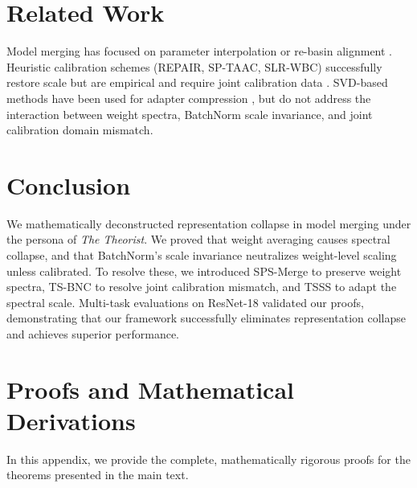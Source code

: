 \documentclass{article}
\theoremstyle{plain}
\theoremstyle{definition}
\theoremstyle{remark}
\begin{document}
\section{Related Work}
Model merging has focused on parameter interpolation \cite{wortsman2022soups, ilharco2022editing} or re-basin alignment \cite{matena2022merging}. Heuristic calibration schemes (REPAIR, SP-TAAC, SLR-WBC) successfully restore scale but are empirical and require joint calibration data \cite{jordan2022repair, vanishing2025feature}. SVD-based methods have been used for adapter compression \cite{stoica2025knots, qiu2025superpose}, but do not address the interaction between weight spectra, BatchNorm scale invariance, and joint calibration domain mismatch.

\section{Conclusion}
We mathematically deconstructed representation collapse in model merging under the persona of \textit{The Theorist}. We proved that weight averaging causes spectral collapse, and that BatchNorm's scale invariance neutralizes weight-level scaling unless calibrated. To resolve these, we introduced SPS-Merge to preserve weight spectra, TS-BNC to resolve joint calibration mismatch, and TSSS to adapt the spectral scale. Multi-task evaluations on ResNet-18 validated our proofs, demonstrating that our framework successfully eliminates representation collapse and achieves superior performance.




\newpage
\appendix
\onecolumn
\section{Proofs and Mathematical Derivations}
\label{appendix:proofs}

In this appendix, we provide the complete, mathematically rigorous proofs for the theorems presented in the main text.
\end{document}

